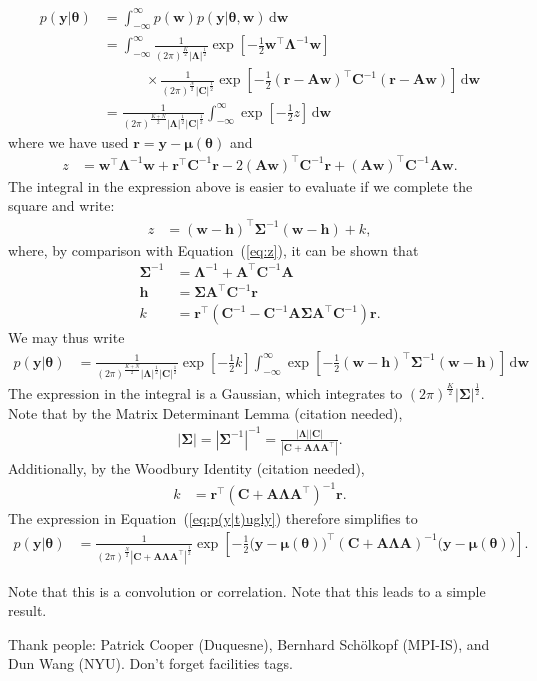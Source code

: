 \documentclass[modern]{rnaastex}
\renewcommand{\eqref}[1]{\ref{eq:#1}}
\newcommand{\Eq}[1]{Equation~(\eqref{#1})}
\newcommand{\eq}[1]{\Eq{#1}}
\newcommand{\eqlabel}[1]{\label{eq:#1}}
\newcommand{\dd}{\ensuremath{\,\mathrm{d}}}
\newcommand{\bvec}[1]{{\ensuremath{\boldsymbol{#1}}}}
\newcommand{\citeme}{{\color{red}(citation needed)}}
\newcommand{\Gaussian}[3]{\ensuremath{\frac{1}{(2\pi)^\frac{#3}{2}|#2|^\frac{1}{2}}
            \exp\left[ -\frac{1}{2}#1^\top #2^{-1} #1 \right]}}
\newcommand{\mA}{\ensuremath{\bvec{A}}}
\newcommand{\mC}{\ensuremath{\bvec{C}}}
\newcommand{\mS}{\ensuremath{\bvec{\Sigma}}}
\newcommand{\mL}{\ensuremath{\bvec{\Lambda}}}
\newcommand{\vw}{\ensuremath{\bvec{w}}}
\newcommand{\vy}{\ensuremath{\bvec{y}}}
\newcommand{\vt}{\ensuremath{\bvec{\theta}}}
\newcommand{\vm}{\ensuremath{\bvec{\mu}(\bvec{\theta})}}
\newcommand{\vre}{\ensuremath{\bvec{r}}}
\newcommand{\vh}{\ensuremath{\bvec{h}}}
\begin{document}
\begin{align}
\eqlabel{integral}
p(\vy | \vt) &= \int_{-\infty}^{\infty} p(\vw) p(\vy | \vt, \vw) \dd\vw \nonumber \\
%
             &= \int_{-\infty}^{\infty} \Gaussian{\vw}{\mL}{K} \nonumber\\
             & \quad\quad\quad \times \Gaussian{(\vre - \mA \vw)}{\mC}{N}
               \dd\vw \nonumber \\
%
             &= \frac{1}{(2 \pi)^\frac{K + N}{2} |\mL|^\frac{1}{2} |\mC|^\frac{1}{2}}
                \int_{-\infty}^{\infty} \exp \left[ -\frac{1}{2} z \right] \dd\vw
\end{align}
%
where we have used $\vre = \vy - \vm$ and
%
\begin{align}
\eqlabel{z}
z &= \vw^\top \mL^{-1} \vw + \vre^\top \mC^{-1} \vre -
     2(\mA \vw)^\top \mC^{-1} \vre + (\mA \vw)^\top \mC^{-1} \mA \vw.
\end{align}
%
The integral in the expression above is easier to evaluate if we
complete the square and write:
%
\begin{align}
\eqlabel{z_square}
z &= (\vw - \vh)^\top \mS^{-1} (\vw - \vh) + k,
\end{align}
%
where, by comparison with \eq{z}, it can be shown that
%
\begin{align}
\mS^{-1} &= \mL^{-1} + \mA^\top \mC^{-1} \mA \\
%
\vh &= \bvec{\Sigma}\mA^\top \mC^{-1} \vre \\
%
k &= \vre^\top \left( \mC^{-1} - \mC^{-1} \mA \mS \mA^\top \mC^{-1} \right) \vre.
\end{align}
%
We may thus write
%
\begin{align}
\eqlabel{p(y|t)ugly}
p(\vy | \vt) &= \frac{1}{(2 \pi)^\frac{K + N}{2}
                |\mL|^\frac{1}{2}
                |\mC|^\frac{1}{2}}
                \exp \left[ -\frac{1}{2}k \right]
                \int_{-\infty}^{\infty} \exp
                \left[-\frac{1}{2}(\vw - \vh)^\top \mS^{-1} (\vw - \vh)
                \right] \dd\vw
\end{align}
%
The expression in the integral is a Gaussian, which integrates to 
$(2\pi)^\frac{K}{2}|\bvec{\Sigma}|^\frac{1}{2}$. 
Note that by the Matrix Determinant Lemma \citeme, 
%
\begin{align}
|\mS| = {|\mS^{-1}|}^{-1} = \frac{|\mL| |\mC|}{|\mC + \mA \mL \mA^\top|}.
\end{align}
%
%
Additionally, by the Woodbury Identity \citeme,
%
\begin{align}
k &= \vre^\top \left( \mC + \mA \mL \mA^\top \right)^{-1} \vre.
\end{align}
%
The expression in \eq{p(y|t)ugly} therefore simplifies to
\begin{align}
\eqlabel{p(y|t)}
p(\vy | \vt) &= \frac{1}{(2 \pi)^\frac{N}{2}
                |\mC + \mA \mL \mA^\top|^\frac{1}{2}} 
                \exp \left[ -\frac{1}{2} \big( \vy - \vm \big)^\top 
                            (\mC + \mA \mL \mA)^{-1} 
                            \big( \vy - \vm \big) 
                     \right].
\end{align}

Note that this is a convolution or correlation. Note that this leads to a simple result.

\acknowledgements
Thank people:
  Patrick Cooper (Duquesne),
  Bernhard Sch\"olkopf (MPI-IS), and
  Dun Wang (NYU).
Don't forget facilities tags.


\end{document}
